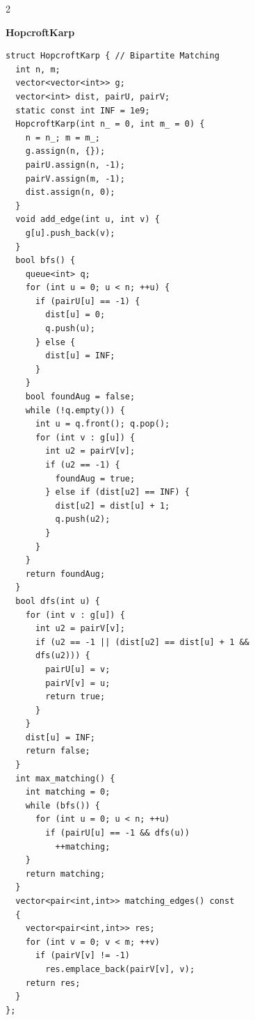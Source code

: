 \documentclass[10pt,a4paper]{article}
\begin{document}
\begin{paracol}{2}
\switchcolumn

\textbf{HopcroftKarp}
\begin{lstlisting}
struct HopcroftKarp { // Bipartite Matching
  int n, m;
  vector<vector<int>> g;
  vector<int> dist, pairU, pairV;
  static const int INF = 1e9;
  HopcroftKarp(int n_ = 0, int m_ = 0) {
    n = n_; m = m_;
    g.assign(n, {});
    pairU.assign(n, -1);
    pairV.assign(m, -1);
    dist.assign(n, 0);
  }
  void add_edge(int u, int v) {
    g[u].push_back(v);
  }
  bool bfs() {
    queue<int> q;
    for (int u = 0; u < n; ++u) {
      if (pairU[u] == -1) {
        dist[u] = 0;
        q.push(u);
      } else {
        dist[u] = INF;
      }
    }
    bool foundAug = false;
    while (!q.empty()) {
      int u = q.front(); q.pop();
      for (int v : g[u]) {
        int u2 = pairV[v];
        if (u2 == -1) {
          foundAug = true;
        } else if (dist[u2] == INF) {
          dist[u2] = dist[u] + 1;
          q.push(u2);
        }
      }
    }
    return foundAug;
  }
  bool dfs(int u) {
    for (int v : g[u]) {
      int u2 = pairV[v];
      if (u2 == -1 || (dist[u2] == dist[u] + 1 &&
      dfs(u2))) {
        pairU[u] = v;
        pairV[v] = u;
        return true;
      }
    }
    dist[u] = INF;
    return false;
  }
  int max_matching() {
    int matching = 0;
    while (bfs()) {
      for (int u = 0; u < n; ++u)
        if (pairU[u] == -1 && dfs(u))
          ++matching;
    }
    return matching;
  }
  vector<pair<int,int>> matching_edges() const
  {
    vector<pair<int,int>> res;
    for (int v = 0; v < m; ++v)
      if (pairV[v] != -1)
        res.emplace_back(pairV[v], v);
    return res;
  }
};
\end{lstlisting}

\switchcolumn


\end{paracol}
\end{document}
